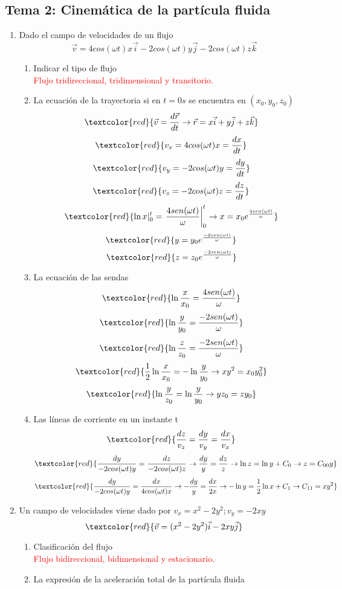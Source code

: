\subsection{Tema 2: Cinemática de la partícula fluida}
\begin{enumerate}
	\item Dado el campo de velocidades de un flujo
	\[\vec{v}=4cos(\omega t)x\vec{i}-2cos(\omega t)y\vec{j}-2cos(\omega t)z\vec{k}\]
	\begin{enumerate}
		\item Indicar el tipo de flujo\\
		\textcolor{red}{Flujo tridireccional, tridimensional y transitorio.}
		\item La ecuación de la trayectoria si en $t=0s$ se encuentra en $(x_0,y_0,z_0)$
		\[\textcolor{red}{\vec{v}=\frac{d\vec{r}}{dt} \rightarrow \vec{r}=x\vec{i}+y\vec{j}+z\vec{k}}\]
		\[\textcolor{red}{v_x=4cos(\omega t)x=\frac{dx}{dt}}\]
		\[\textcolor{red}{v_y= -2cos(\omega t)y = \frac{dy}{dt}}\]
		\[\textcolor{red}{v_z= -2cos(\omega t)z = \frac{dz}{dt}} \]
		\[\textcolor{red}{\ln x|_0^t=\left.{\frac{4sen(\omega t)}{\omega}}\right |_0^t \rightarrow x=x_0 e^{\frac{4sen(\omega t)}{\omega}}}\]
		\[\textcolor{red}{y=y_0 e^{\frac{-2sen(\omega t)}{\omega}}}\]
		\[\textcolor{red}{z=z_0 e^{\frac{-2sen(\omega t)}{\omega}}}\]
		\item La ecuación de las sendas
		\[\textcolor{red}{\ln \frac{x}{x_0}=\frac{4sen(\omega t)}{\omega}}\]
		\[\textcolor{red}{\ln \frac{y}{y_0}=\frac{-2sen(\omega t)}{\omega}}\]
		\[\textcolor{red}{\ln \frac{z}{z_0}=\frac{-2sen(\omega t)}{\omega}}\]
		\[\textcolor{red}{\frac{1}{2}\ln \frac{x}{x_0}=-\ln \frac{y}{y_0} \rightarrow xy^2=x_0y_0^2}\]
		\[\textcolor{red}{\ln \frac{y}{z_0}=\ln \frac{y}{y_0} \rightarrow yz_0=zy_0}\]
		\item Las líneas de corriente en un instante t
		\[\textcolor{red}{\frac{dz}{v_z}=\frac{dy}{v_y}=\frac{dx}{v_x}}\]
		\[\textcolor{red}{\frac{dy}{-2cos(\omega t)y}=\frac{dz}{-2cos(\omega t)z}\rightarrow \frac{dy}{y}=\frac{dz}{z}\rightarrow \ln z = \ln y + C_0 \rightarrow z=C_{00}y}\]
		\[\textcolor{red}{\frac{dy}{-2cos(\omega t)y}=\frac{dx}{4cos(\omega t)x}\rightarrow -\frac{dy}{y}=\frac{dx}{2x}\rightarrow -\ln y = \frac{1}{2}\ln x + C_1 \rightarrow C_{11}=xy^2 }\]
	\end{enumerate}
	\item Un campo de velocidades viene dado por $v_x=x^2-2y^2; v_y=-2xy$
	\[\textcolor{red}{\vec{v}=(x^2-2y^2)\vec{i}-2xy\vec{j}}\]
	\begin{enumerate}
		\item Clasificación del flujo\\
		\textcolor{red}{Flujo bidireccional, bidimensional y estacionario.}
		\item La expresión de la aceleración total de la partícula fluida
	

\end{enumerate}
\end{enumerate}
